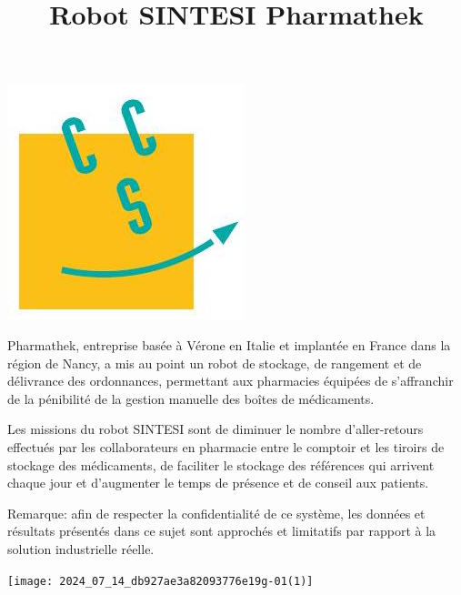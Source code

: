 \documentclass[10pt]{article}
\title{Robot SINTESI Pharmathek }
\author{}
\date{}
\begin{document}
\maketitle
\begin{center}
\includegraphics[max width=\textwidth]{2024_07_14_db927ae3a82093776e19g-01}
\end{center}

Pharmathek, entreprise basée à Vérone en Italie et implantée en France dans la région de Nancy, a mis au point un robot de stockage, de rangement et de délivrance des ordonnances, permettant aux pharmacies équipées de s'affranchir de la pénibilité de la gestion manuelle des boîtes de médicaments.

Les missions du robot SINTESI sont de diminuer le nombre d'aller-retours effectués par les collaborateurs en pharmacie entre le comptoir et les tiroirs de stockage des médicaments, de faciliter le stockage des références qui arrivent chaque jour et d'augmenter le temps de présence et de conseil aux patients.

Remarque: afin de respecter la confidentialité de ce système, les données et résultats présentés dans ce sujet sont approchés et limitatifs par rapport à la solution industrielle réelle.

\begin{center}
\texttt{[image: 2024\_07\_14\_db927ae3a82093776e19g-01(1)]}
\end{center}
\end{document}
